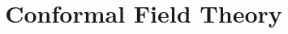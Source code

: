 \documentclass[]{report}
\title{Conformal Field Theory}
\begin{document}
    \maketitle
    \tableofcontents
    \pagebreak
    
    
    
\end{document}
